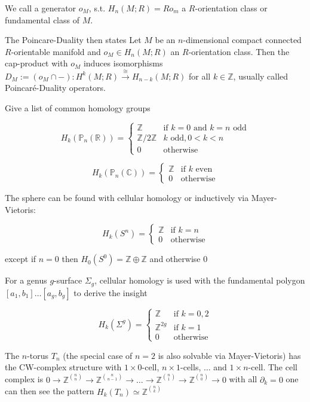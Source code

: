 We call a generator \( o_M \), s.t. \( H_n(M;R) = Ro_m \) a \( R \)-orientation class or fundamental class of \( M \).

The Poincare-Duality then states
Let \(M\) be an \(n\)-dimensional compact connected \(R\)-orientable manifold and \(o_M \in H_n(M; R)\) an \(R\)-orientation class. 
Then the cap-product with \(o_M\) induces isomorphisms 
\(
D_M := (o_M \cap -) \colon H^k(M; R) \xrightarrow{\cong} H_{n-k}(M; R)
\)
for all \(k \in \mathbb{Z}\), usually called Poincaré-Duality operators.



Give a list of common homology groups

\[ H_k(\mathbb{P}_n(\mathbb{R})) = 
\begin{cases} 
\mathbb{Z} & \text{if } k = 0 \text{ and } k = n \text{ odd} \\
\mathbb{Z}/2\mathbb{Z} &  k \text{ odd}, 0 < k < n \\
0 & \text{otherwise}
\end{cases} \]

\[ H_k(\mathbb{P}_n(\mathbb{C})) = 
\begin{cases} 
\mathbb{Z} & \text{if } k \text{ even} \\
0 & \text{otherwise}
\end{cases} \]

The sphere can be found with cellular homology or inductively via Mayer-Vietoris:

\[ H_k(S^n) = 
\begin{cases} 
\mathbb{Z} & \text{if } k = n \\
0 & \text{otherwise}
\end{cases} \]

except if \( n = 0 \) then \( H_0(S^0) = \mathbb{Z} \oplus \mathbb{Z} \) and otherwise \( 0 \)

For a genus \( g \)-surface \( \Sigma_g \), cellular homology is used with the fundamental polygon \( [a_1,b_1]\dots[a_g,b_g] \) to derive the insight

\[ H_k(\Sigma^g) = 
\begin{cases} 
\mathbb{Z} & \text{if } k = 0,2 \\
\mathbb{Z}^{2g} & \text{if } k = 1 \\
0 & \text{otherwise}
\end{cases} \]

The \( n \)-torus \( T_n \) (the special case of \( n = 2 \) is also solvable via Mayer-Vietoris)
has the CW-complex structure with \( 1 \times 0 \)-cell, \( n \times 1 \)-cells, \( \dots \) and \( 1 \times n\)-cell.
The cell complex is
\( 0 \to \mathbb{Z}^\binom{n}{n} \to \mathbb{Z}^\binom{n}{n-1} \to \dots \to \mathbb{Z}^\binom{n}{1} \to \mathbb{Z}^\binom{n}{0} \to 0\)
with all \( \partial_k = 0 \) one can then see the pattern
\( H_k(T_n) \simeq \mathbb{Z}^\binom{n}{k}\)

